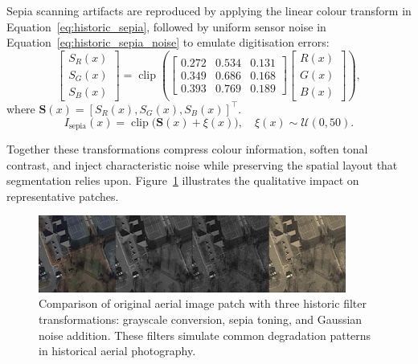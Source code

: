 Sepia scanning artifacts are reproduced by applying the linear colour transform in Equation~\ref{eq:historic_sepia}, followed by uniform sensor noise in Equation~\ref{eq:historic_sepia_noise} to emulate digitisation errors:
\begin{equation}
\begin{bmatrix}
S_R(x) \\
S_G(x) \\
S_B(x)
\end{bmatrix}
= \operatorname{clip}\left(
\begin{bmatrix}
0.272 & 0.534 & 0.131 \\
0.349 & 0.686 & 0.168 \\
0.393 & 0.769 & 0.189
\end{bmatrix}
\begin{bmatrix}
R(x) \\
G(x) \\
B(x)
\end{bmatrix}
\right),
\label{eq:historic_sepia}
\end{equation}
where $\mathbf{S}(x) = [S_R(x), S_G(x), S_B(x)]^\top$.
\begin{equation}
I_{\text{sepia}}(x) = \operatorname{clip}\big(\mathbf{S}(x) + \xi(x)\big), \quad \xi(x) \sim \mathcal{U}(0, 50).
\label{eq:historic_sepia_noise}
\end{equation}

Together these transformations compress colour information, soften tonal contrast, and inject characteristic noise while preserving the spatial layout that segmentation relies upon. Figure~\ref{fig:historic_filters} illustrates the qualitative impact on representative patches.

\begin{figure}[H]
\centering
\includegraphics[width=0.9\textwidth]{Images/filters.png}
\caption{Comparison of original aerial image patch with three historic filter transformations: grayscale conversion, sepia toning, and Gaussian noise addition. These filters simulate common degradation patterns in historical aerial photography.}
\label{fig:historic_filters}
\end{figure}


